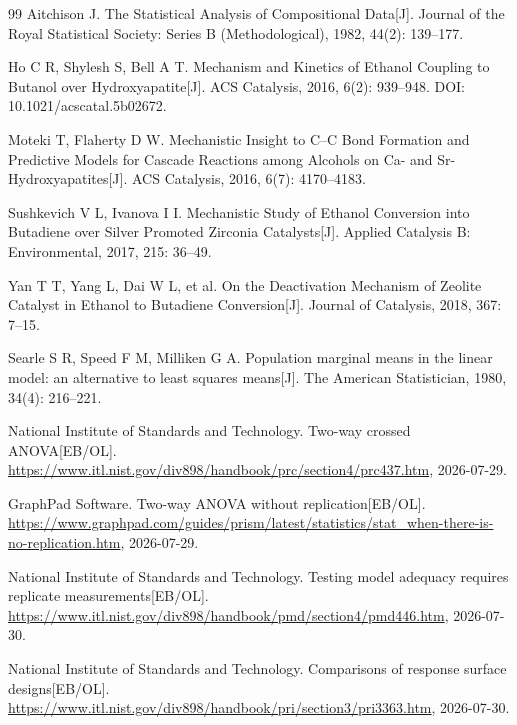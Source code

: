 \begingroup
\sloppy
\begin{thebibliography}{99}
Aitchison J. The Statistical Analysis of Compositional Data[J]. Journal of the Royal
Statistical Society: Series B (Methodological), 1982, 44(2): 139--177.

Ho C R, Shylesh S, Bell A T. Mechanism and Kinetics of Ethanol Coupling to Butanol
over Hydroxyapatite[J]. ACS Catalysis, 2016, 6(2): 939--948.
DOI: 10.1021/acscatal.5b02672.

Moteki T, Flaherty D W. Mechanistic Insight to C--C Bond Formation and Predictive
Models for Cascade Reactions among Alcohols on Ca- and Sr-Hydroxyapatites[J].
ACS Catalysis, 2016, 6(7): 4170--4183.

Sushkevich V L, Ivanova I I. Mechanistic Study of Ethanol Conversion into Butadiene
over Silver Promoted Zirconia Catalysts[J]. Applied Catalysis B: Environmental, 2017,
215: 36--49.

Yan T T, Yang L, Dai W L, et al. On the Deactivation Mechanism of Zeolite Catalyst
in Ethanol to Butadiene Conversion[J]. Journal of Catalysis, 2018, 367: 7--15.

Searle S R, Speed F M, Milliken G A.
Population marginal means in the linear model: an alternative to least squares means[J].
The American Statistician, 1980, 34(4): 216--221.

National Institute of Standards and Technology.
Two-way crossed ANOVA[EB/OL].
\url{https://www.itl.nist.gov/div898/handbook/prc/section4/prc437.htm},
2026-07-29.

GraphPad Software.
Two-way ANOVA without replication[EB/OL].
\url{https://www.graphpad.com/guides/prism/latest/statistics/stat_when-there-is-no-replication.htm},
2026-07-29.

National Institute of Standards and Technology.
Testing model adequacy requires replicate measurements[EB/OL].
\url{https://www.itl.nist.gov/div898/handbook/pmd/section4/pmd446.htm},
2026-07-30.

National Institute of Standards and Technology.
Comparisons of response surface designs[EB/OL].
\url{https://www.itl.nist.gov/div898/handbook/pri/section3/pri3363.htm},
2026-07-30.
\end{thebibliography}
\endgroup
